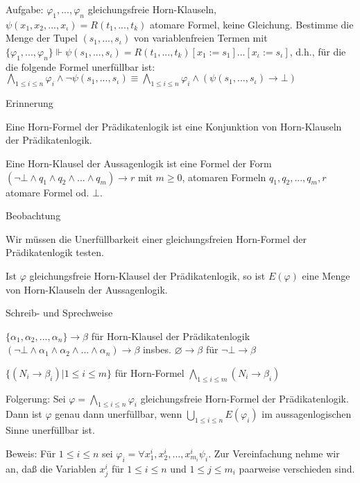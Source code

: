 \documentclass[a4paper]{article}
\begin{document}
\begin{multicols}{3}
  Aufgabe:
  $\varphi_1,...,\varphi_n$ gleichungsfreie Horn-Klauseln, $\psi(x_1,x_2,...,x_{\iota} )=R(t_1,...,t_k)$ atomare Formel, keine Gleichung. Bestimme die Menge der Tupel $(s_1,...,s_{\iota} )$ von variablenfreien Termen mit $\{\varphi_1,...,\varphi_n\}\Vdash\psi(s_1,...,s_{\iota} )=R(t_1,...,t_k)[x_1:=s_1]...[x_{\iota} :=s_{\iota} ]$, d.h., für die die folgende Formel unerfüllbar ist: $\bigwedge_{1\leq i\leq n} \varphi_i \wedge \lnot\psi(s_1,...,s_{\iota} ) \equiv \bigwedge_{1\leq i\leq n} \varphi_i\wedge(\psi(s_1,...,s_{\iota} )\rightarrow\bot)$

  Erinnerung
  \begin{itemize*}
    \item Eine Horn-Formel der Prädikatenlogik ist eine Konjunktion von Horn-Klauseln der Prädikatenlogik.
    \item Eine Horn-Klausel der Aussagenlogik ist eine Formel der Form $(\lnot\bot\wedge q_1\wedge q_2 \wedge...\wedge q_m)\rightarrow r$ mit $m\geq 0$, atomaren Formeln $q_1,q_2,...,q_m, r$ atomare Formel od. $\bot$.
  \end{itemize*}

  Beobachtung
  \begin{itemize*}
    \item Wir müssen die Unerfüllbarkeit einer gleichungsfreien Horn-Formel der Prädikatenlogik testen.
    \item Ist $\varphi$ gleichungsfreie Horn-Klausel der Prädikatenlogik, so ist $E(\varphi)$ eine Menge von Horn-Klauseln der Aussagenlogik.
  \end{itemize*}

  Schreib- und Sprechweise
  \begin{itemize*}
    \item $\{\alpha_1,\alpha_2,...,\alpha_n\}\rightarrow\beta$ für Horn-Klausel der Prädikatenlogik $(\lnot\bot\wedge\alpha_1 \wedge\alpha_2\wedge...\wedge\alpha_n)\rightarrow\beta$ insbes. $\varnothing\rightarrow\beta$ für $\lnot\bot\rightarrow\beta$
    \item $\{(N_i\rightarrow\beta_i) | 1\leq i\leq m\}$ für Horn-Formel $\bigwedge_{1\leq i\leq m} (N_i\rightarrow\beta_i)$
  \end{itemize*}

  Folgerung: Sei $\varphi =\bigwedge_{1\leq i\leq n} \varphi_i$ gleichungsfreie Horn-Formel der Prädikatenlogik. Dann ist $\varphi$ genau dann unerfüllbar, wenn $\bigcup_{1\leq i\leq n} E(\varphi_i)$ im aussagenlogischen Sinne unerfüllbar ist.

  Beweis: Für $1\leq i\leq n$ sei $\varphi_i=\forall x_1^i,x_2^i,...,x_{m_i}^i \psi_i$.
  Zur Vereinfachung nehme wir an, daß die Variablen $x_j^i$ für $1\leq i\leq n$ und $1\leq j\leq m_i$ paarweise verschieden sind.


\end{multicols}
\end{document}
